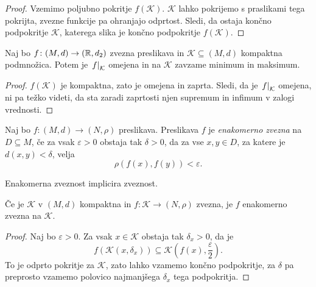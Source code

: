 \documentclass[12pt, a4paper]{article}
\begin{document}
\begin{proof}
Vzemimo poljubno pokritje $f(\mathcal{K})$. $\mathcal{K}$ lahko pokrijemo s praslikami tega pokrijta, zvezne funkcije pa ohranjajo odprtost. Sledi, da ostaja končno podpokritje $\mathcal{K}$, katerega slika je končno podpokritje $f(\mathcal{K})$.
\end{proof}

\begin{posledica}
Naj bo $f\colon (M,d)\to(\mathbb{R},d_2)$ zvezna preslikava in $\mathcal{K}\subseteq(M,d)$ kompaktna podmnožica. Potem je $\left. f\right|_{\mathcal{K}}^{}$ omejena in na $\mathcal{K}$ zavzame minimum in maksimum.
\end{posledica}

\begin{proof}
$f(\mathcal{K})$ je kompaktna, zato je omejena in zaprta. Sledi, da je $\left. f\right|_{\mathcal{K}}^{}$ omejena, ni pa težko videti, da sta zaradi zaprtosti njen supremum in infimum v zalogi vrednosti.
\end{proof}

\begin{definicija}
Naj bo $f\colon (M,d)\to(N,\rho)$ preslikava. Preslikava $f$ je \emph{enakomerno zvezna} na $D\subseteq M$, če za vsak $\varepsilon>0$ obstaja tak $\delta>0$, da za vse $x,y\in D$, za katere je $d(x,y)<\delta$, velja
\[
\rho(f(x),f(y))<\varepsilon.
\]
\end{definicija}

\begin{opomba}
Enakomerna zveznost implicira zveznost.
\end{opomba}

\begin{izrek}
Če je $\mathcal{K}$ v $(M,d)$ kompaktna in $f\colon\mathcal{K}\to(N,\rho)$ zvezna, je $f$ enakomerno zvezna na $\mathcal{K}$.
\end{izrek}

\begin{proof}
Naj bo $\varepsilon>0$. Za vsak $x\in\mathcal{K}$ obstaja tak $\delta_x>0$, da je
\[
f(\mathcal{K}(x,\delta_x))\subseteq\mathcal{K}\left(f(x),\frac{\varepsilon}{2}\right).
\]
To je odprto pokritje za $\mathcal{K}$, zato lahko vzamemo končno podpokritje, za $\delta$ pa preprosto vzamemo polovico najmanjšega $\delta_x$ tega podpokritja.
\end{proof}

\newpage
\printindex
\end{document}
